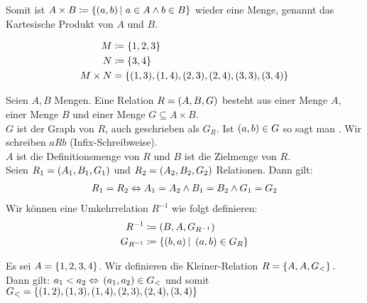 \begin{definition}
    Somit ist $A \times B \coloneqq \left\{\left(a,b\right)|~a\in A \land b \in B\right\}$ wieder eine Menge, genannt das Kartesische Produkt von $A$ und $B$.
\end{definition}

\begin{beispiel}
    \begin{align*}
        M &\coloneqq \left\{1,2,3\right\}\\
        N &\coloneqq \left\{3,4\right\}\\
        M\times N &= \left\{(1,3), (1,4), (2,3), (2,4), (3,3), (3,4)\right\}
    \end{align*}
\end{beispiel}


\begin{definition}[Relation]
    Seien $A, B$ Mengen. Eine Relation $R=\left(A, B, G\right)$ besteht aus einer Menge $A$, einer Menge $B$ und einer Menge $G\subseteq A\times B$.\\
    $G$ ist der Graph von $R$, auch geschrieben als $G_R$.
    Ist $\left(a,b\right)\in G$ so sagt man . Wir schreiben $aRb$ (Infix-Schreibweise).\\
    $A$ ist die Definitionsmenge von $R$ und $B$ ist die Zielmenge von $R$.\\[10pt]
    Seien $R_1 = \left(A_1, B_1, G_1\right)$ und $R_2 = \left(A_2, B_2, G_2\right)$ Relationen. Dann gilt:
    \begin{align*}
        R_1 = R_2 \Leftrightarrow{} A_1 = A_2 \land B_1 = B_2 \land G_1 = G_2
    \end{align*}
    Wir können eine Umkehrrelation $R^{-1}$ wie folgt definieren:
    \begin{align*}
        R^{-1} &\coloneqq \left(B,A,G_{R^{-1}}\right)\\
        G_{R^{-1}} &\coloneqq \left\{\left(b,a\right) |~\left(a,b\right) \in G_R\right\}
    \end{align*}
\end{definition}

\begin{beispiel}
    Es sei $A = \left\{1,2,3,4\right\}$. Wir definieren die Kleiner-Relation $R=\left\{A, A, G_{<}\right\}.$\\
    Dann gilt: $a_1 < a_2 \Leftrightarrow{} \left(a_1, a_2\right) \in G_{<}$ und somit $G_{<} = \left\{(1,2), (1,3), (1,4), (2,3), (2,4), (3,4)\right\}$
\end{beispiel}

\vfill
\newpage

